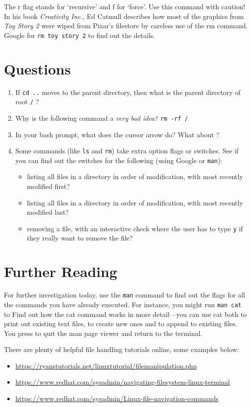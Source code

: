\documentclass{article}
\begin{document}
The r flag stands for `recursive' and f for `force'. Use this command with caution! In his book \textit{Creativity Inc.}, Ed Catmull describes how most of the graphics from \textit{Toy Story 2} were wiped from Pixar's filestore by careless use of the rm command. Google for \texttt{rm toy story 2} to find out the details.

\section*{Questions}

\begin{enumerate}
\item If \texttt{cd ..} moves to the parent directory, then what is the parent directory of root \texttt{/} ?
\item Why is the following command a \emph{very bad idea?} \texttt{rm -rf /}
\item In your bash prompt, what does the \keys{\arrowkeyup}  cursor arrow do? What about \keys{\arrowkeydown}?
\item Some commands (like \texttt{ls} and \texttt{rm}) take extra option flags or switches. See if you can find out the switches for the following (using Google or \texttt{man}):
  \begin{itemize}
  \item listing all files in a directory in order of modification, with most recently modified first?
  \item listing all files in a directory in order of modification, with most recently modified last?
  \item removing a file, with an interactive check where the user has to type \texttt{y} if they really want to remove the file?
  \end{itemize}
\end{enumerate}


\section*{Further Reading}

For further investigation today, use the \texttt{man} command to find out 
the flags for all the commands you have already executed.
For instance, you might run \texttt{man cat} to Find out how the cat command works in more detail---you can use cat both to print out existing text files, to create new ones and to append to existing files.
You press  to quit the man page viewer and return to the terminal.

There are plenty of helpful file handling tutorials online, some examples
below:
\begin{itemize}
\item \url{https://ryanstutorials.net/linuxtutorial/filemanipulation.php}
\item \url{https://www.redhat.com/sysadmin/navigating-filesystem-linux-terminal}
\item \url{https://www.redhat.com/sysadmin/Linux-file-navigation-commands}
\end{itemize}
  
  
\end{document}

